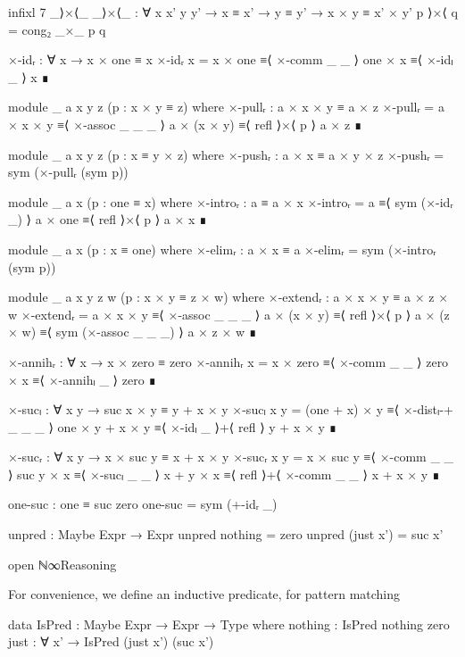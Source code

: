 \begin{code}[hide]
    infixl 7 _⟩×⟨_
    _⟩×⟨_ : ∀ {x x' y y'} → x ≡ x' → y ≡ y' → x × y ≡ x' × y'
    p ⟩×⟨ q = cong₂ _×_ p q

    ×-idᵣ : ∀ x → x × one ≡ x
    ×-idᵣ x =
      x × one ≡⟨ ×-comm _ _ ⟩
      one × x ≡⟨ ×-idₗ _ ⟩
      x       ∎

    module _ {a x y z} (p : x × y ≡ z) where
      ×-pullᵣ : a × x × y ≡ a × z
      ×-pullᵣ =
        a × x × y   ≡⟨ ×-assoc _ _ _ ⟩
        a × (x × y) ≡⟨ refl ⟩×⟨ p ⟩
        a × z       ∎

    module _ {a x y z} (p : x ≡ y × z) where
      ×-pushᵣ : a × x ≡ a × y × z
      ×-pushᵣ = sym (×-pullᵣ (sym p))

    module _ {a x} (p : one ≡ x) where
      ×-introᵣ : a ≡ a × x
      ×-introᵣ =
        a       ≡⟨ sym (×-idᵣ _) ⟩
        a × one ≡⟨ refl ⟩×⟨ p ⟩
        a × x   ∎

    module _ {a x} (p : x ≡ one) where
      ×-elimᵣ : a × x ≡ a
      ×-elimᵣ = sym (×-introᵣ (sym p))

    module _ {a x y z w} (p : x × y ≡ z × w) where
      ×-extendᵣ : a × x × y ≡ a × z × w
      ×-extendᵣ =
        a × x × y   ≡⟨ ×-assoc _ _ _ ⟩
        a × (x × y) ≡⟨ refl ⟩×⟨ p ⟩
        a × (z × w) ≡⟨ sym (×-assoc _ _ _) ⟩
        a × z × w   ∎

    ×-annihᵣ : ∀ x → x × zero ≡ zero
    ×-annihᵣ x =
      x × zero ≡⟨ ×-comm _ _ ⟩
      zero × x ≡⟨ ×-annihₗ _ ⟩
      zero     ∎

    ×-sucₗ : ∀ x y → suc x × y ≡ y + x × y
    ×-sucₗ x y =
      (one + x) × y   ≡⟨ ×-distₗ-+ _ _ _ ⟩
      one × y + x × y ≡⟨ ×-idₗ _ ⟩+⟨ refl ⟩
      y + x × y       ∎

    ×-sucᵣ : ∀ x y → x × suc y ≡ x + x × y
    ×-sucᵣ x y =
      x × suc y ≡⟨ ×-comm _ _ ⟩
      suc y × x ≡⟨ ×-sucₗ _ _ ⟩
      x + y × x ≡⟨ refl ⟩+⟨ ×-comm _ _ ⟩
      x + x × y ∎

    one-suc : one ≡ suc zero
    one-suc = sym (+-idᵣ _)

    unpred : Maybe Expr → Expr
    unpred nothing = zero
    unpred (just x') = suc x'

  open ℕ∞Reasoning
\end{code}
For convenience, we define an inductive predicate, for pattern matching
\begin{code}
  data IsPred : Maybe Expr → Expr → Type where
    nothing : IsPred nothing zero
    just : ∀ x' → IsPred (just x') (suc x')
\end{code}
